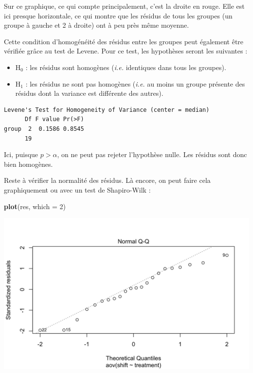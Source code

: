 \documentclass[a4paperpaper,]{article}
\newenvironment{Shaded}{\begin{snugshade}}{\end{snugshade}}
\newcommand{\DataTypeTok}[1]{\textcolor[rgb]{0.00,0.34,0.68}{#1}}
\newcommand{\DecValTok}[1]{\textcolor[rgb]{0.69,0.50,0.00}{#1}}
\newcommand{\KeywordTok}[1]{\textcolor[rgb]{0.12,0.11,0.11}{\textbf{#1}}}
\newcommand{\NormalTok}[1]{\textcolor[rgb]{0.12,0.11,0.11}{#1}}
\newcommand{\OperatorTok}[1]{\textcolor[rgb]{0.12,0.11,0.11}{#1}}
\newcommand{\StringTok}[1]{\textcolor[rgb]{0.75,0.01,0.01}{#1}}
\providecommand{\tightlist}{%
  \setlength{\itemsep}{0pt}\setlength{\parskip}{0pt}}
\begin{document}
Sur ce graphique, ce qui compte principalement, c'est la droite en rouge. Elle est ici presque horizontale, ce qui montre que les résidus de tous les groupes (un groupe à gauche et 2 à droite) ont à peu près même moyenne.

Cette condition d'homogénéité des résidus entre les groupes peut également être vérifiée grâce au test de Levene. Pour ce test, les hypothèses seront les suivantes :

\begin{itemize}
\tightlist
\item
  H\(_0\) : les résidus sont homogènes (\emph{i.e.} identiques dans tous les groupes).
\item
  H\(_1\) : les résidus ne sont pas homogènes (\emph{i.e.} au moins un groupe présente des résidus dont la variance est différente des autres).
\end{itemize}

\begin{Shaded}
\end{Shaded}

\begin{verbatim}
Levene's Test for Homogeneity of Variance (center = median)
      Df F value Pr(>F)
group  2  0.1586 0.8545
      19               
\end{verbatim}

Ici, puisque \(p > \alpha\), on ne peut pas rejeter l'hypothèse nulle. Les résidus sont donc bien homogènes.

Reste à vérifier la normalité des résidus. Là encore, on peut faire cela graphiquement ou avec un test de Shapiro-Wilk :

\begin{Shaded}
\begin{Highlighting}[]
\KeywordTok{plot}\NormalTok{(res, }\DataTypeTok{which =} \DecValTok{2}\NormalTok{)}
\end{Highlighting}
\end{Shaded}

\begin{center}\includegraphics[width=0.9\linewidth]{figure/unnamed-chunk-82-1} \end{center}
\end{document}
